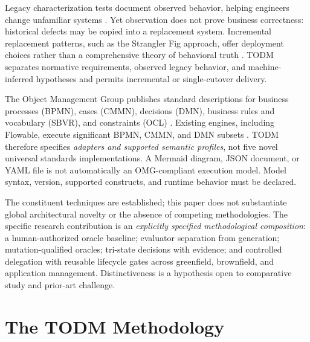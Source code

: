 \documentclass[11pt,a4paper]{article}
\newcommand{\todm}{\textsc{TODM}}
\begin{document}
Legacy characterization tests document observed behavior, helping engineers change unfamiliar systems \cite{feathers2004legacy}. Yet observation does not prove business correctness: historical defects may be copied into a replacement system. Incremental replacement patterns, such as the Strangler Fig approach, offer deployment choices rather than a comprehensive theory of behavioral truth \cite{fowler2004strangler}. \todm{} separates normative requirements, observed legacy behavior, and machine-inferred hypotheses and permits incremental or single-cutover delivery.

The Object Management Group publishes standard descriptions for business processes (BPMN), cases (CMMN), decisions (DMN), business rules and vocabulary (SBVR), and constraints (OCL) \cite{omg2014bpmn,omg2016cmmn,omg2024dmn,omg2019sbvr,omg2014ocl}. Existing engines, including Flowable, execute significant BPMN, CMMN, and DMN subsets \cite{flowable2026}. TODM therefore specifies \emph{adapters and supported semantic profiles}, not five novel universal standards implementations. A Mermaid diagram, JSON document, or YAML file is not automatically an OMG-compliant execution model. Model syntax, version, supported constructs, and runtime behavior must be declared.

The constituent techniques are established; this paper does not substantiate global architectural novelty or the absence of competing methodologies. The specific research contribution is an \emph{explicitly specified methodological composition}: a human-authorized oracle baseline; evaluator separation from generation; mutation-qualified oracles; tri-state decisions with evidence; and controlled delegation with reusable lifecycle gates across greenfield, brownfield, and application management. Distinctiveness is a hypothesis open to comparative study and prior-art challenge.

\section{The TODM Methodology}
\end{document}
